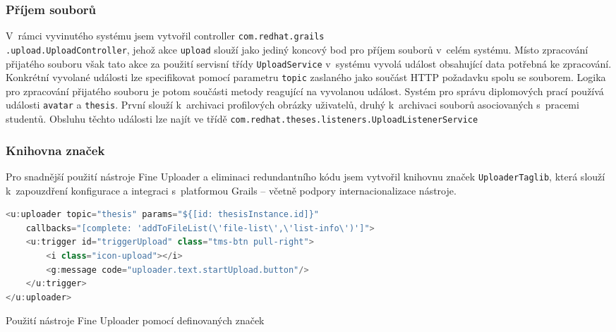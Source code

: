 \subsubsection{\textbf{Příjem souborů}}
V~rámci vyvinutého systému jsem vytvořil controller \texttt{com.redhat.grails\\.upload.UploadController}, jehož akce \texttt{upload} slouží jako jediný koncový bod pro příjem souborů v~celém systému. Místo zpracování přijatého souboru však tato akce za použití servisní třídy \texttt{UploadService} v~systému vyvolá událost obsahující data potřebná ke zpracování. Konkrétní vyvolané události lze specifikovat pomocí parametru \texttt{topic} zaslaného jako součást HTTP požadavku spolu se souborem. Logika pro zpracování přijatého souboru je potom součásti metody reagující na vyvolanou událost. Systém pro správu diplomových prací používá události \texttt{avatar} a \texttt{thesis}. První slouží k~archivaci profilových obrázky uživatelů, druhý k~archivaci souborů asociovaných s~pracemi studentů. Obsluhu těchto události lze najít ve třídě \texttt{com.redhat.theses.listeners.UploadListenerService}

\subsubsection{\textbf{Knihovna značek}}
Pro snadnější použití nástroje Fine Uploader a eliminaci redundantního kódu jsem vytvořil knihovnu značek \texttt{UploaderTaglib}, která slouží k~zapouzdření konfigurace a integraci s~platformou Grails -- včetně podpory internacionalizace nástroje.
\begin{example}
    \centering
    \begin{lstlisting}[language=Java]
<u:uploader topic="thesis" params="${[id: thesisInstance.id]}"
    callbacks="[complete: 'addToFileList(\'file-list\',\'list-info\')']">
    <u:trigger id="triggerUpload" class="tms-btn pull-right">
        <i class="icon-upload"></i>
        <g:message code="uploader.text.startUpload.button"/>
    </u:trigger>
</u:uploader>
    \end{lstlisting}
    \caption{Použití nástroje Fine Uploader pomocí definovaných značek}
\end{example}
